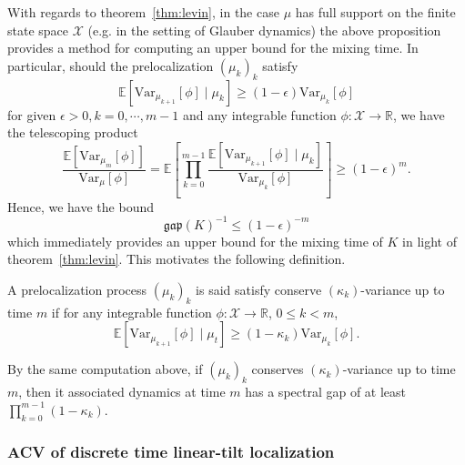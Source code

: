 With regards to theorem~\ref{thm:levin}, in the case \(\mu\) has full support on the finite state space 
\(\mathcal{X}\) (e.g. in the setting of Glauber dynamics) the above proposition provides a method for 
computing an upper bound for the mixing time. In particular, should the prelocalization \((\mu_k)_k\)
satisfy 
\[\mathbb{E}[\text{Var}_{\mu_{k + 1}}[\phi] \mid \mu_k] \ge (1 - \epsilon)\text{Var}_{\mu_k}[\phi]\]
for given \(\epsilon > 0, k = 0, \cdots, m - 1\) and any integrable function \(\phi : \mathcal{X} \to \mathbb{R}\), we have the 
telescoping product
\[\frac{\mathbb{E}[\text{Var}_{\mu_m}[\phi]]}{\text{Var}_\mu[\phi]} 
  = \mathbb{E}\left[\prod_{k = 0}^{m - 1}\frac{\mathbb{E}[\text{Var}_{\mu_{k + 1}}[\phi] \mid \mu_k]}{\text{Var}_{\mu_k}[\phi]}\right]
  \ge (1 - \epsilon)^m.\]
Hence, we have the bound 
\[\mathfrak{gap}(K)^{-1} \le (1 - \epsilon)^{-m}\]
which immediately provides an upper bound for the mixing time of \(K\) in light of theorem~\ref{thm:levin}.
This motivates the following definition.

\begin{definition}
  A prelocalization process \((\mu_k)_k\) is said satisfy conserve \((\kappa_k)\)-variance 
  up to time \(m\) if for any integrable function \(\phi : \mathcal{X} \to \mathbb{R}\), \(0 \le k < m\),
  \[\mathbb{E}[\text{Var}_{\mu_{k + 1}}[\phi] \mid \mu_t] \ge (1 - \kappa_k)\text{Var}_{\mu_k}[\phi].\]
\end{definition}

By the same computation above, if \((\mu_k)_k\) conserves \((\kappa_k)\)-variance up to time \(m\), 
then it associated dynamics at time \(m\) has a spectral gap of at least \(\prod_{k = 0}^{m - 1} (1 - \kappa_k)\).

\subsubsection{ACV of discrete time linear-tilt localization}

